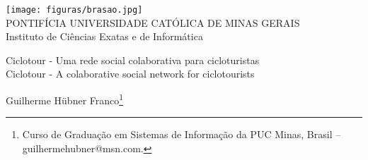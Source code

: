 \documentclass[a4paper,12pt,Times]{article}
\makeatletter
\newcommand{\monog}{Ciclotour - Uma rede social colaborativa para cicloturistas}
\newcommand{\monogES}{Ciclotour - A colaborative social network for ciclotourists}
\newcommand{\origem}{Brasil }
\newcommand{\AutorA}{Guilherme Hübner Franco}
\newcommand{\funcaoA}{}
\newcommand{\emailA}{guilherme\underline{\space}hubner@msn.com}
\newcommand{\cursA}{Curso de Graduação em Sistemas de Informação da PUC Minas}
\newcommand{\keyword}[1]{\textsf{#1}}
\makeatother
\begin{document}

\begin{center}
\texttt{[image: figuras/brasao.jpg]} \\
PONTIFÍCIA UNIVERSIDADE CATÓLICA DE MINAS GERAIS \\
Instituto de Ciências Exatas e de Informática


\end{center}

 \vspace{0cm} {
 \singlespacing \Large{\monog {} \\ }
  \normalsize{\monogES}
 }

\vspace{1.0cm}

\begin{flushright}
\singlespacing 
\normalsize{\AutorA \footnote{\funcaoA \cursA, \origem -- \emailA . }} \\
\end{flushright}
\thispagestyle{empty}

\vspace{1.0cm}

\begin{abstract}
\noindent
Este trabalho tem como objetivo o desenvolvimento de uma rede social com o foco em 
cicloturismo, onde os usuários podem à partir da interação com o sistema, ter acesso à informações 
relevantes em relação às rotas que pretendem percorrer, auxiliando no planejamento da atividade 
turística. Esta rede social seguirá o modelo centrado em dados onde os usuários serão responsáveis 
por alimentar a base de dados do sistema de forma colaborativa, assim será possível centralizar 
informações sobre as rotas. 
\\\textbf{\keyword{Palavras-chave: }} Rede Social, Cicloturismo.
\end{abstract}
\end{document}
